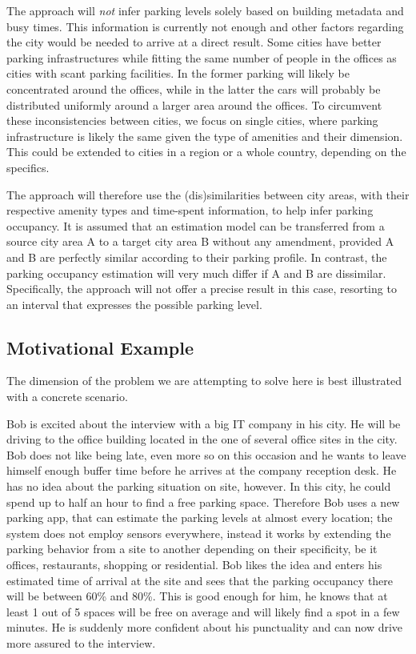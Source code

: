 \documentclass{ws-ijait}
\begin{document}
	The approach will \textit{not} infer parking levels solely based on building metadata and busy times. This information is currently not enough and other factors regarding the city would be needed to arrive at a direct result. Some cities have better parking infrastructures while fitting the same number of people in the offices as cities with scant parking facilities. In the former parking will likely be concentrated around the offices, while in the latter the cars will probably be distributed uniformly around a larger area around the offices. To circumvent these inconsistencies between cities, we focus on single cities, where parking infrastructure is likely the same given the type of amenities and their dimension. This could be extended to cities in a region or a whole country, depending on the specifics.
	
	The approach will therefore use the (dis)similarities between city areas, with their respective amenity types and time-spent information, to help infer parking occupancy. It is assumed that an estimation model can be transferred from a source city area A to a target city area B without any amendment, provided A and B are perfectly similar according to their parking profile. In contrast, the parking occupancy estimation will very much differ if A and B are dissimilar. Specifically, the approach will not offer a precise result in this case, resorting to an interval that expresses the possible parking level.
	
	\subsection{Motivational Example}
	The dimension of the problem we are attempting to solve here is best illustrated with a concrete scenario.
	
	Bob is excited about the interview with a big IT company in his city. He will be driving to the office building located in the one of several office sites in the city. Bob does not like being late, even more so on this occasion and he wants to leave himself enough buffer time before he arrives at the company reception desk. He has no idea about the parking situation on site, however. In this city, he could spend up to half an hour to find a free parking space. Therefore Bob uses a new parking app, that can estimate the parking levels at almost every location; the system does not employ sensors everywhere, instead it works by extending the parking behavior from a site to another depending on their specificity, be it offices, restaurants, shopping or residential. Bob likes the idea and enters his estimated time of arrival at the site and sees that the parking occupancy there will be between 60\% and 80\%. This is good enough for him, he knows that at least 1 out of 5 spaces will be free on average and will likely find a spot in a few minutes. He is suddenly more confident about his punctuality and can now drive more assured to the interview.
	
\end{document}
